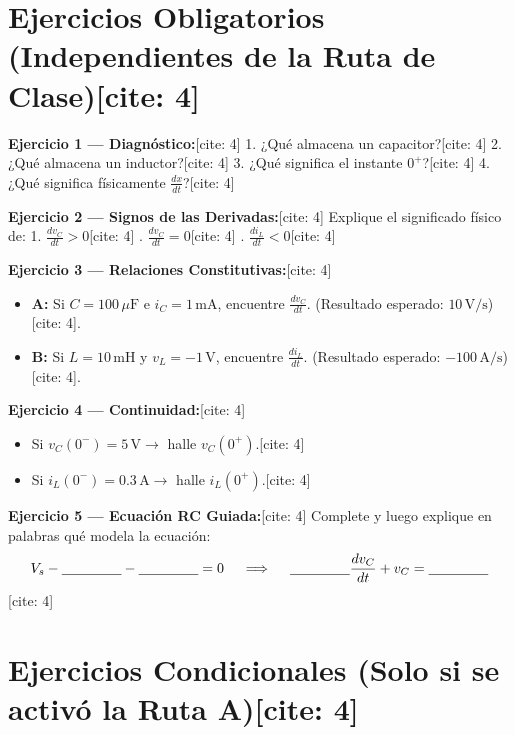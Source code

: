 \documentclass[11pt, a4paper]{article}
\begin{document}
\begin{tcolorbox}[colback=ucbblue!5!white, colframe=ucbblue, title=\textbf{Artefacto 5: Práctica de Fundamentos (Set de Respaldo)}]
\end{tcolorbox}

\section*{Ejercicios Obligatorios (Independientes de la Ruta de Clase)[cite: 4]}

\textbf{Ejercicio 1 — Diagnóstico:}[cite: 4]
1. ¿Qué almacena un capacitor?[cite: 4]
2. ¿Qué almacena un inductor?[cite: 4]
3. ¿Qué significa el instante $0^+$?[cite: 4]
4. ¿Qué significa físicamente $\frac{dx}{dt}$?[cite: 4]

\textbf{Ejercicio 2 — Signos de las Derivadas:}[cite: 4]
Explique el significado físico de:
1. $\frac{dv_C}{dt} > 0$[cite: 4] . $\frac{dv_C}{dt} = 0$[cite: 4] . $\frac{di_L}{dt} < 0$[cite: 4]

\textbf{Ejercicio 3 — Relaciones Constitutivas:}[cite: 4]
\begin{itemize}
    \item \textbf{A:} Si $C=100\,\mu\text{F}$ e $i_C=1\,\text{mA}$, encuentre $\frac{dv_C}{dt}$. (Resultado esperado: $10\,\text{V/s}$)[cite: 4].
    \item \textbf{B:} Si $L=10\,\text{mH}$ y $v_L=-1\,\text{V}$, encuentre $\frac{di_L}{dt}$. (Resultado esperado: $-100\,\text{A/s}$)[cite: 4].
\end{itemize}

\textbf{Ejercicio 4 — Continuidad:}[cite: 4]
\begin{itemize}
    \item Si $v_C(0^-) = 5\,\text{V} \rightarrow$ halle $v_C(0^+)$.[cite: 4]
    \item Si $i_L(0^-) = 0.3\,\text{A} \rightarrow$ halle $i_L(0^+)$.[cite: 4]
\end{itemize}

\textbf{Ejercicio 5 — Ecuación RC Guiada:}[cite: 4]
Complete y luego explique en palabras qué modela la ecuación:
$$ V_s - \underline{\hspace{1.5cm}} - \underline{\hspace{1.5cm}} = 0 \quad \implies \quad \underline{\hspace{1.5cm}}\frac{dv_C}{dt} + v_C = \underline{\hspace{1.5cm}} $$[cite: 4]

\section*{Ejercicios Condicionales (Solo si se activó la Ruta A)[cite: 4]}
\end{document}
